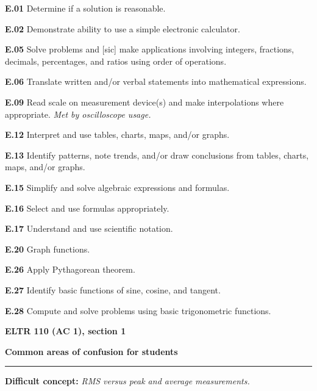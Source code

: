 \item{\bf E.01} Determine if a solution is reasonable.
\item{\bf E.02} Demonstrate ability to use a simple electronic calculator.
\item{\bf E.05} Solve problems and [sic] make applications involving integers, fractions, decimals, percentages, and ratios using order of operations.
\item{\bf E.06} Translate written and/or verbal statements into mathematical expressions.
\item{\bf E.09} Read scale on measurement device(s) and make interpolations where appropriate.  {\it Met by oscilloscope usage.}
\item{\bf E.12} Interpret and use tables, charts, maps, and/or graphs.
\item{\bf E.13} Identify patterns, note trends, and/or draw conclusions from tables, charts, maps, and/or graphs.
\item{\bf E.15} Simplify and solve algebraic expressions and formulas.
\item{\bf E.16} Select and use formulas appropriately.
\item{\bf E.17} Understand and use scientific notation.
\item{\bf E.20} Graph functions.
\item{\bf E.26} Apply Pythagorean theorem.
\item{\bf E.27} Identify basic functions of sine, cosine, and tangent.
\item{\bf E.28} Compute and solve problems using basic trigonometric functions.
\medskip





\vfil \eject

\centerline{\bf ELTR 110 (AC 1), section 1} \bigskip 
 
\vskip 10pt

\noindent
{\bf Common areas of confusion for students}

\vskip 5pt

\hrule \vskip 5pt

\vskip 10pt

\noindent
{\bf Difficult concept: } {\it RMS versus peak and average measurements.}

